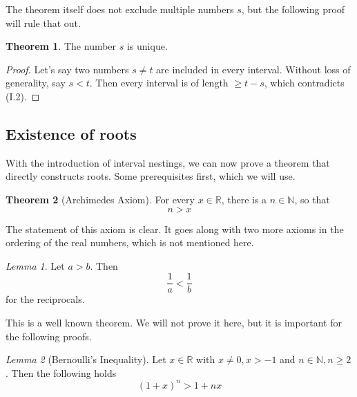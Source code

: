 \documentclass[a4paper, 10pt]{article}
\theoremstyle{remark}
\newtheorem{lemma}{Lemma}
\theoremstyle{definition}
\newtheorem{theorem}{Theorem}
\begin{document}
    The theorem itself does not exclude multiple numbers \(s\), but the following proof will rule that out.

    \begin{theorem}
        The number \(s\) is unique.
    \end{theorem}

    \begin{proof}
        Let's say two numbers \(s \neq t\) are included in every interval. Without loss of generality, say \(s < t\). Then every interval is of length \(\geq t - s\), which contradicts (I.2). \lightning
    \end{proof}

    \subsection{Existence of roots}

    With the introduction of interval nestings, we can now prove a theorem that directly constructs roots. Some prerequisites first, which we will use.

    \begin{theorem}[Archimedes Axiom]
        For every \(x \in \mathbb{R}\), there is a \(n \in \mathbb{N}\), so that
        \[
            n > x
        \]
    \end{theorem}

    The statement of this axiom is clear. It goes along with two more axioms in the ordering of the real numbers, which is not mentioned here.

    \begin{lemma}
        Let \(a > b\). Then
        \[
            \frac{1}{a} < \frac{1}{b}
        \]
        for the reciprocals.
    \end{lemma}

    This is a well known theorem. We will not prove it here, but it is important for the following proofs.

    \begin{lemma}[Bernoulli's Inequality]
        Let \(x \in \mathbb{R}\) with \(x \neq 0, x > -1\) and \(n \in \mathbb{N}, n \geq 2\). Then the following holds
        \[
            (1+x)^n > 1 + nx
        \]
    \end{lemma}
\end{document}
